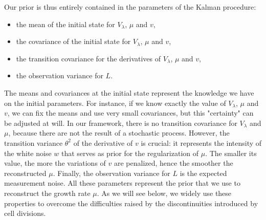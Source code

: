 Our prior is thus entirely contained in the parameters of the Kalman procedure:
\begin{itemize}
\item the mean of the initial state for $V_\lambda$, $\mu$ and $v$,
\item the covariance of the initial state for $V_\lambda$, $\mu$ and $v$,
\item the transition covariance for the derivatives of $V_\lambda$, $\mu$ and $v$,
\item the observation variance for $L$.
\end{itemize}
The means and covariances at the initial state represent the knowledge we have on the initial parameters.
For instance, if we know exactly the value of $V_\lambda$, $\mu$ and $v$, we can fix the means and use very small covariances, but this "certainty" can be adjusted at will.
In our framework, there is no transition covariance for $V_\lambda$ and $\mu$, because there are not the result of a stochastic process.
However, the transition variance $\theta^2$ of the derivative of $v$ is crucial: it represents the intensity of the white noise $w$ that serves as prior for the regularization of $\mu$.
The smaller its value, the more the variations of $v$ are penalized, hence the smoother the reconstructed $\mu$.
Finally, the observation variance for $L$ is the expected measurement noise.
All these parameters represent the prior that we use to reconstruct the growth rate $\mu$.
As we will see below, we widely use these properties to overcome the difficulties raised by the discontinuities introduced by cell divisions.

